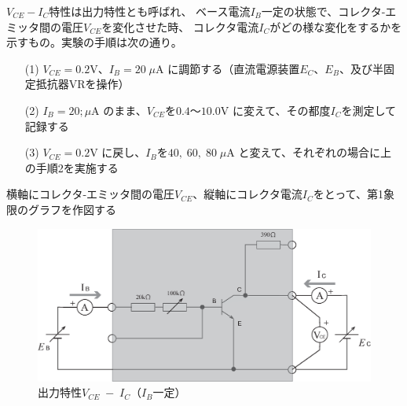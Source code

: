 \documentclass[uplatex,a4paper,11pt,oneside,openany]{jsbook}
\begin{document}
$V_{CE}-I_C$特性は出力特性とも呼ばれ、
ベース電流$I_B$一定の状態で、コレクタ-エミッタ間の電圧$V_{CE}$を変化させた時、
コレクタ電流$I_C$がどの様な変化をするかを示すもの。実験の手順は次の通り。
\begin{enumerate}
\item[(1)] $V_{CE}=0.2$V、$I_B=20\;\mu$A に調節する（直流電源装置$E_C$、$E_B$、及び半固定抵抗器VRを操作）
\item[(2)] $I_B=20;\mu$A のまま、$V_{CE}$を$0.4$〜$10.0$V に変えて、その都度$I_C$を測定して記録する
\item[(3)] $V_{CE}=0.2$V に戻し、$I_B$を$40,\;60,\;80\;\mu$A と変えて、それぞれの場合に上の手順2を実施する    
\end{enumerate}
横軸にコレクタ-エミッタ間の電圧$V_{CE}$、縦軸にコレクタ電流$I_C$をとって、第1象限のグラフを作図する

\vfill

\begin{figure}[H]
  \centering
   \includegraphics[keepaspectratio, scale=0.45, angle=0]
               {figs/eps/ex1.eps}
               \caption{出力特性$V_{CE}\;-\;I_C$（$I_B$一定）}
               \label{fig:ex1}
\end{figure}

\vfill
\end{document}
